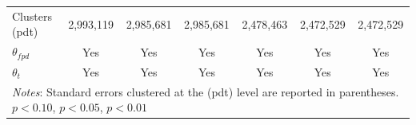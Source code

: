 {\begin{tabular}{l*{6}{c}}
Clusters (pdt)  &2,993,119         &2,985,681         &2,985,681         &2,478,463         &2,472,529         &2,472,529         \\
$\theta_{fpd}$  &      Yes         &      Yes         &      Yes         &      Yes         &      Yes         &      Yes         \\
$\theta_t$      &      Yes         &      Yes         &      Yes         &      Yes         &      Yes         &      Yes         \\
\bottomrule
\multicolumn{7}{l}{\footnotesize \textit{Notes}: Standard errors clustered at the (pdt) level are reported in parentheses. \sym{*} \(p<0.10\), \sym{**} \(p<0.05\), \sym{***} \(p<0.01\)}\\
\end{tabular}
}
